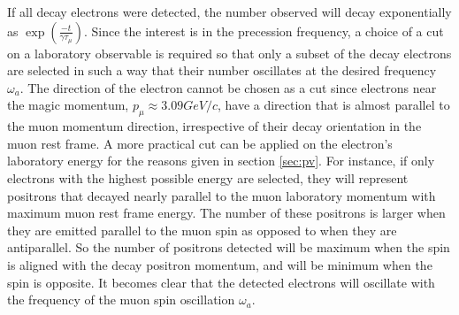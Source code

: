 \documentclass{outhesis}
\begin{document}
If all decay electrons were detected, the number observed will decay exponentially as $\exp(\frac{-t}{\gamma \tau_{\mu}})$. Since the interest is in the precession frequency, a choice of a cut on a laboratory observable is required so that only a subset of the decay electrons are selected in such a way that their number oscillates at the desired frequency $\omega_a$. The direction of the electron cannot be chosen as a cut since electrons near the magic momentum, $p_{\mu} \approx 3.09 GeV/c$, have a direction that is almost parallel to the muon momentum direction, irrespective of their decay orientation in the muon rest frame. A more practical cut can be applied on the electron's laboratory energy for the reasons given in section \ref{sec:pv}. For instance, if only electrons with the highest possible energy are selected, they will represent positrons that decayed nearly parallel to the muon laboratory momentum with maximum muon rest frame energy. The number of these positrons is larger when they are emitted parallel to the muon spin as opposed to when they are antiparallel. So the number of positrons detected will be maximum when the spin is aligned with the decay positron momentum, and will be minimum when the spin is opposite. It becomes clear that the detected electrons will oscillate with the frequency of the muon spin oscillation $\omega_a$.
\end{document}
